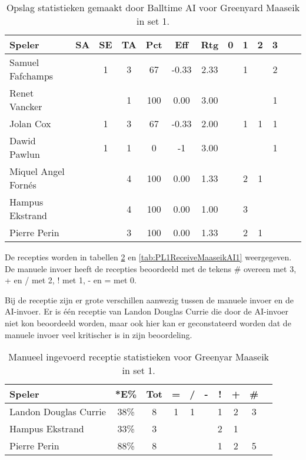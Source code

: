 \begin{table}[ht!]
  \centering
  \scriptsize
  \begin{tabular}{|l|c|c|c|c|c|c|c|c|c|c|c|c|} \hline
    \textbf{Speler} & SA & SE & TA & Pct & Eff & Rtg & 0 & 1 & 2 & 3 \\ \hline
    Samuel Fafchamps &  & 1 & 3 & 67 & -0.33 & 2.33 &  & 1 &  & 2  \\
    Renet Vancker &  &  & 1 & 100 & 0.00 & 3.00 &  &  &  & 1  \\
    Jolan Cox &  & 1 & 3 & 67 & -0.33 & 2.00 &  & 1 & 1 & 1 \\
    Dawid Pawlun &  & 1 & 1 & 0 & -1 & 3.00 &  &  &  & 1 \\
    Miquel Angel Fornés &  &  & 4 & 100 & 0.00 & 1.33 &  & 2 & 1 & \\
    Hampus Ekstrand &  &  & 4 & 100 & 0.00 & 1.00 &  & 3 &  & \\
    Pierre Perin &  &  & 3 & 100 & 0.00 & 1.33 &  & 2 & 1 & \\ \hline
  \end{tabular}
  \caption[Opslag statistieken gemaakt door Balltime AI voor Greenyard Maaseik in set 1]{\label{tab:PL1ServeMaaseikAI1}Opslag statistieken gemaakt door Balltime AI voor Greenyard Maaseik in set 1.}
\end{table}

De recepties worden in tabellen \ref{tab:PL1ReceiveMaaseikMan1} en \ref{tab:PL1ReceiveMaaseikAI1} weergegeven. De manuele invoer heeft de recepties beoordeeld met de tekens \# overeen met 3, + en / met 2, ! met 1, - en = met 0.

Bij de receptie zijn er grote verschillen aanwezig tussen de manuele invoer en de AI-invoer. Er is één receptie van Landon Douglas Currie die door de AI-invoer niet kon beoordeeld worden, maar ook hier kan er geconstateerd worden dat de manuele invoer veel kritischer is in zijn beoordeling. 

\begin{table}[ht!]
    \centering
    \scriptsize
    \begin{tabular}{|l|c|c|c|c|c|c|c|c|c|}
        \hline
        \textbf{Speler} & *E\% & Tot & = & / & - & ! & + & \# \\ \hline
        Landon Douglas Currie & 38\% & 8 & 1 & 1 &  & 1 & 2 & 3 \\ 
        Hampus Ekstrand & 33\% & 3 &  &  &  & 2 & 1 &  \\ 
        Pierre Perin & 88\% & 8 &  &  &  & 1 & 2 & 5  \\ \hline
    \end{tabular}
    \caption[Manueel ingevoerd receptie statistieken voor Greenyar Maaseik in set 1]{\label{tab:PL1ReceiveMaaseikMan1}Manueel ingevoerd receptie statistieken voor Greenyar Maaseik in set 1.}
\end{table}

